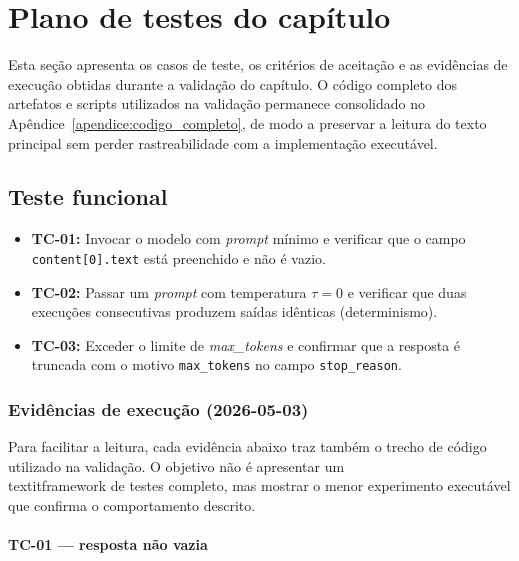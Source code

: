 \section{Plano de testes do cap\'itulo}

Esta se\c{c}\~ao apresenta os casos de teste, os crit\'erios de
aceita\c{c}\~ao e as evid\^encias de execu\c{c}\~ao obtidas durante a
valida\c{c}\~ao do cap\'itulo. O c\'odigo completo dos artefatos e
scripts utilizados na valida\c{c}\~ao permanece consolidado no
Ap\^endice~\ref{apendice:codigo_completo}, de modo a preservar a
leitura do texto principal sem perder rastreabilidade com a
implementa\c{c}\~ao execut\'avel.

\subsection{Teste funcional}

\begin{itemize}[leftmargin=*]
  \item \textbf{TC-01:} Invocar o modelo com \textit{prompt} m\'inimo
        e verificar que o campo \texttt{content[0].text} est\'a
        preenchido e n\~ao \'e vazio.
  \item \textbf{TC-02:} Passar um \textit{prompt} com temperatura
        $\tau = 0$ e verificar que duas execu\c{c}\~oes consecutivas
        produzem sa\'idas id\^enticas (determinismo).
  \item \textbf{TC-03:} Exceder o limite de \textit{max\_tokens} e
        confirmar que a resposta \'e truncada com o motivo
        \texttt{max\_tokens} no campo \texttt{stop\_reason}.
\end{itemize}

\subsubsection*{Evid\^encias de execu\c{c}\~ao (2026-05-03)}

Para facilitar a leitura, cada evid\^encia abaixo traz tamb\'em o
trecho de c\'odigo utilizado na valida\c{c}\~ao. O objetivo n\~ao \'e
apresentar um \\textit{framework} de testes completo, mas mostrar o
menor experimento execut\'avel que confirma o comportamento descrito.

\paragraph{TC-01 --- resposta n\~ao vazia}

